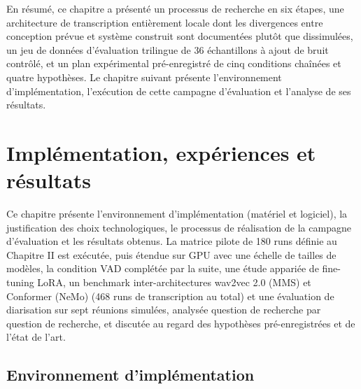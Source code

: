 \documentclass[12pt]{report}
\begin{document}
\vspace{0.5em}
En résumé, ce chapitre a présenté un processus de recherche en six étapes, une architecture de transcription entièrement locale dont les divergences entre conception prévue et système construit sont documentées plutôt que dissimulées, un jeu de données d'évaluation trilingue de 36 échantillons à ajout de bruit contrôlé, et un plan expérimental pré-enregistré de cinq conditions chaînées et quatre hypothèses. Le chapitre suivant présente l'environnement d'implémentation, l'exécution de cette campagne d'évaluation et l'analyse de ses résultats.
\chapter{Implémentation, expériences et résultats}
Ce chapitre présente l'environnement d'implémentation (matériel et logiciel), la justification des choix technologiques, le processus de réalisation de la campagne d'évaluation et les résultats obtenus. La matrice pilote de 180 runs définie au Chapitre II est exécutée, puis étendue sur GPU avec une échelle de tailles de modèles, la condition VAD complétée par la suite, une étude appariée de fine-tuning LoRA, un benchmark inter-architectures wav2vec 2.0 (MMS) et Conformer (NeMo) (468 runs de transcription au total) et une évaluation de diarisation sur sept réunions simulées, analysée question de recherche par question de recherche, et discutée au regard des hypothèses pré-enregistrées et de l'état de l'art.
\section{Environnement d'implémentation}
\end{document}
